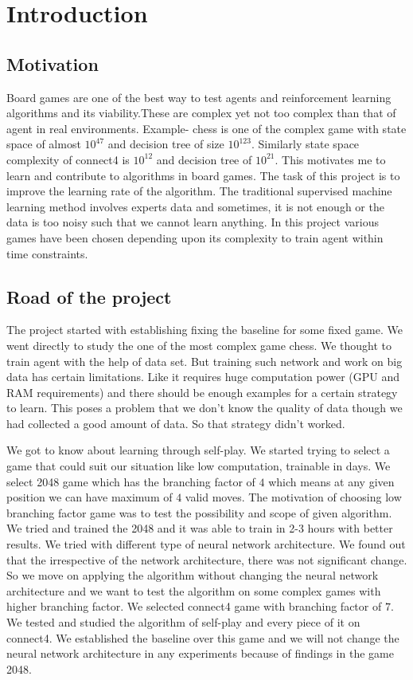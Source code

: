 \chapter{Introduction}
\hspace{3mm}
\section{Motivation}
Board games are one of the best way to test agents and reinforcement learning algorithms and  its viability.These are complex yet not too complex than that of agent in real environments. Example- chess is one of the complex game with state space of almost $10^{47}$ and decision tree of size $10^{123}$. Similarly state space complexity of connect4 is $10^{12}$ and decision tree of $10^{21}$. This motivates me to learn and contribute to algorithms in board games. The task of this project is to improve the learning rate of the algorithm. The traditional supervised machine learning method involves experts data and sometimes, it is not enough or the data is too noisy such that we cannot learn anything. In this project various games have been chosen depending upon its complexity to train agent within time constraints.

\section{Road of the project}
The project started with establishing fixing the baseline for some fixed game. We went directly to study the one of the most complex game chess. We thought to train agent with the help of data set. But training such network and work on big data has certain limitations. Like it requires huge computation power (GPU and RAM requirements) and there should be enough examples for a certain strategy to learn. This poses a problem that we don't know the quality of data though we had collected a good amount of data. So that strategy didn't worked. 


We got to know about learning through self-play. We started trying to select a game that could suit our situation like low computation, trainable in days. We select 2048 game which has the branching factor of $4$ which means at any given position we can have maximum of $4$ valid moves. The motivation of choosing low branching factor game was to test the possibility and scope of given algorithm. We tried and trained the 2048 and it was able to train in 2-3 hours with better results. We tried with different type of neural network architecture. We found out that the irrespective of the network architecture, there was not significant change.
So we move on applying the algorithm without changing the neural network architecture and we want to test the algorithm on some complex games with higher branching factor. We selected connect4 game with branching factor of $7$. We tested and studied the algorithm of self-play and every piece of it on connect4. We established the baseline over this game and we will not change the neural network architecture in any experiments because of findings in the game 2048.

